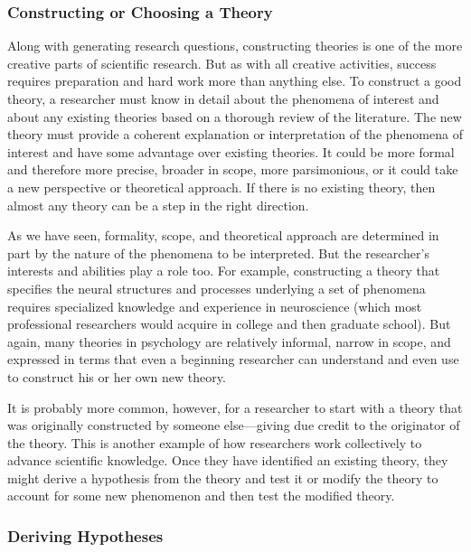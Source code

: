 \documentclass[
]{krantz}
\begin{document}
\hypertarget{constructing-or-choosing-a-theory}{%
\subsubsection*{Constructing or Choosing a Theory}\label{constructing-or-choosing-a-theory}}


Along with generating research questions, constructing theories is one of the more creative parts of scientific research. But as with all creative activities, success requires preparation and hard work more than anything else. To construct a good theory, a researcher must know in detail about the phenomena of interest and about any existing theories based on a thorough review of the literature. The new theory must provide a coherent explanation or interpretation of the phenomena of interest and have some advantage over existing theories. It could be more formal and therefore more precise, broader in scope, more parsimonious, or it could take a new perspective or theoretical approach. If there is no existing theory, then almost any theory can be a step in the right direction.

As we have seen, formality, scope, and theoretical approach are determined in part by the nature of the phenomena to be interpreted. But the researcher's interests and abilities play a role too. For example, constructing a theory that specifies the neural structures and processes underlying a set of phenomena requires specialized knowledge and experience in neuroscience (which most professional researchers would acquire in college and then graduate school). But again, many theories in psychology are relatively informal, narrow in scope, and expressed in terms that even a beginning researcher can understand and even use to construct his or her own new theory.

It is probably more common, however, for a researcher to start with a theory that was originally constructed by someone else---giving due credit to the originator of the theory. This is another example of how researchers work collectively to advance scientific knowledge. Once they have identified an existing theory, they might derive a hypothesis from the theory and test it or modify the theory to account for some new phenomenon and then test the modified theory.

\hypertarget{deriving-hypotheses}{%
\subsubsection*{Deriving Hypotheses}\label{deriving-hypotheses}}
\end{document}
